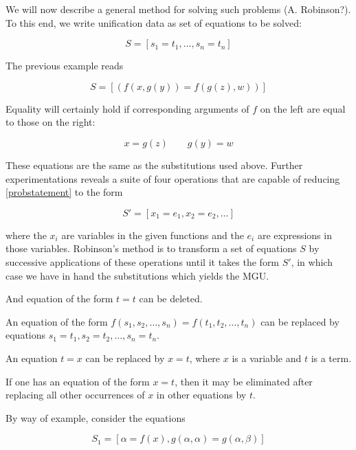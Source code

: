 We will now describe a general method for solving such problems (A. Robinson?).  To this end, we write unification data as set of equations to be solved:

\begin{equation}
\label{probstatement}
S = [s_1 = t_1, \ldots, s_n = t_n]
\end{equation}

The previous example reads

\begin{equation}
S = [ ( f(x,g(y)) =f(g(z), w) )]
\end{equation}

Equality will certainly hold if corresponding arguments of $f$ on the left are equal to those on the right:

\begin{equation}
x = g(z) \qquad g(y) = w
\end{equation}

These equations are the same as the substitutions used above.  Further experimentations reveals a suite of four operations that are capable of reducing  \eqref{probstatement} to the form

\begin{equation}
\label{probsolution}
S' = [x_1 = e_1, x_2 = e_2, \ldots]
\end{equation}

where the $x_i$ are variables in the given functions and the $e_i$ are expressions in those variables.  Robinson's method is to transform a set of equations $S$ by successive applications of these operations until it takes the form $S'$, in which case we have in hand the substitutions which yields the MGU. 

 And equation of the form $t = t$ can be deleted.

 An equation of the form $f(s_1, s_2, \ldots ,s_n) = f(t_1, t_2, \ldots ,t_n)$ can be replaced by equations $s_1 = t_1, s_2 = t_2, \ldots, s_n = t_n$.

 An equation $t = x$ can be replaced by $x = t$, where $x$ is a variable and $t$ is a term.

 If one has an equation of the form $x = t$, then it may be eliminated after replacing all other occurrences of $x$ in other equations by $t$.

By way of example, consider the equations

\begin{equation}
S_1 = [\alpha = f(x), g(\alpha, \alpha) = g(\alpha, \beta)]
\end{equation}

